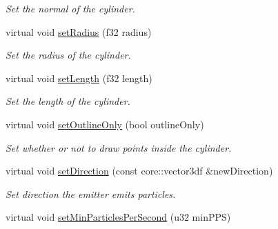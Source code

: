 \begin{DoxyCompactItemize}
\begin{DoxyCompactList}\small\item\em Set the normal of the cylinder. \end{DoxyCompactList}\item 
\hypertarget{classirr_1_1scene_1_1_c_particle_cylinder_emitter_a93c9c3a88e7f274a01ce01ed37aec991}{virtual void \hyperlink{classirr_1_1scene_1_1_c_particle_cylinder_emitter_a93c9c3a88e7f274a01ce01ed37aec991}{set\-Radius} (f32 radius)}\label{classirr_1_1scene_1_1_c_particle_cylinder_emitter_a93c9c3a88e7f274a01ce01ed37aec991}

\begin{DoxyCompactList}\small\item\em Set the radius of the cylinder. \end{DoxyCompactList}\item 
\hypertarget{classirr_1_1scene_1_1_c_particle_cylinder_emitter_a3c9d15214e1531427188de4b22fd6605}{virtual void \hyperlink{classirr_1_1scene_1_1_c_particle_cylinder_emitter_a3c9d15214e1531427188de4b22fd6605}{set\-Length} (f32 length)}\label{classirr_1_1scene_1_1_c_particle_cylinder_emitter_a3c9d15214e1531427188de4b22fd6605}

\begin{DoxyCompactList}\small\item\em Set the length of the cylinder. \end{DoxyCompactList}\item 
\hypertarget{classirr_1_1scene_1_1_c_particle_cylinder_emitter_a63743a364c9bb215541ba932eeb94277}{virtual void \hyperlink{classirr_1_1scene_1_1_c_particle_cylinder_emitter_a63743a364c9bb215541ba932eeb94277}{set\-Outline\-Only} (bool outline\-Only)}\label{classirr_1_1scene_1_1_c_particle_cylinder_emitter_a63743a364c9bb215541ba932eeb94277}

\begin{DoxyCompactList}\small\item\em Set whether or not to draw points inside the cylinder. \end{DoxyCompactList}\item 
\hypertarget{classirr_1_1scene_1_1_c_particle_cylinder_emitter_a915805af68533ab8198388b733e138bf}{virtual void \hyperlink{classirr_1_1scene_1_1_c_particle_cylinder_emitter_a915805af68533ab8198388b733e138bf}{set\-Direction} (const core\-::vector3df \&new\-Direction)}\label{classirr_1_1scene_1_1_c_particle_cylinder_emitter_a915805af68533ab8198388b733e138bf}

\begin{DoxyCompactList}\small\item\em Set direction the emitter emits particles. \end{DoxyCompactList}\item 
\hypertarget{classirr_1_1scene_1_1_c_particle_cylinder_emitter_ad6bf29530f4da12440de7d6c3503c327}{virtual void \hyperlink{classirr_1_1scene_1_1_c_particle_cylinder_emitter_ad6bf29530f4da12440de7d6c3503c327}{set\-Min\-Particles\-Per\-Second} (u32 min\-P\-P\-S)}\label{classirr_1_1scene_1_1_c_particle_cylinder_emitter_ad6bf29530f4da12440de7d6c3503c327}


\end{DoxyCompactItemize}
